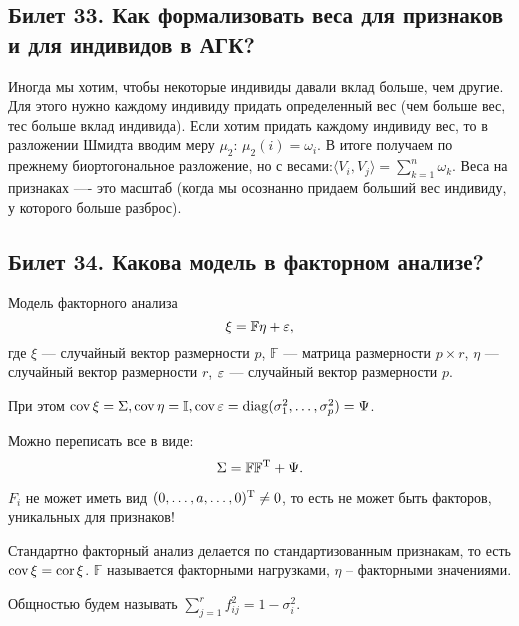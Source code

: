 \subsection{Билет 33. Как формализовать веса для признаков и для индивидов в АГК?}
Иногда мы хотим, чтобы некоторые индивиды давали вклад больше, чем другие. Для этого нужно каждому индивиду придать определенный вес (чем больше вес, тес больше вклад индивида). 
Если хотим придать каждому индивиду вес, то в разложении Шмидта вводим меру $\mu_2$: $\mu_2({i})=\omega_i$. В итоге получаем по прежнему биортогональное разложение, но с весами:$\langle V_i,V_j \rangle =\sum_{k=1} ^n \omega_k$. 
Веса на признаках —- это масштаб (когда мы осознанно придаем больший вес индивиду, у которого больше разброс).

\subsection{Билет 34. Какова модель в факторном анализе?}
Модель факторного анализа
\begin{equation*}
\xi = \mathbb{F}\eta + \varepsilon, 
\end{equation*}
где $\xi$ --- случайный вектор размерности $p$,
$\mathbb{F}$ --- матрица размерности $p \times r$, 
$\eta$ ---случайный вектор размерности $r$, $\varepsilon$ --- случайный вектор размерности $p$. 

При этом $\operatorname{cov} \xi = \Sigma, \operatorname{cov} \eta = \mathbb{I}, \operatorname{cov} \varepsilon = \operatorname{diag}(\sigma^2_1, \ldots, \sigma^2_p) = \Psi$.

Можно переписать все в виде:
\begin{equation*}
\Sigma = \mathbb{F}\mathbb{F}^{\operatorname{T}} + \Psi.
\end{equation*}
\begin{note}
$F_i$ не может иметь вид $(0, \ldots, a, \ldots, 0)^{\operatorname{T}} \ne  0$, то есть не может быть факторов, уникальных для признаков!
\end{note}

Стандартно факторный анализ делается по стандартизованным признакам, то есть $\operatorname{cov} \xi = \operatorname{cor} \xi$.
$\mathbb{F}$ называется факторными нагрузками, $\eta$ -- факторными значениями.

Общностью будем называть $\sum\limits_{j = 1}^{r} f^2_{ij} = 1 - \sigma^2_i$.

